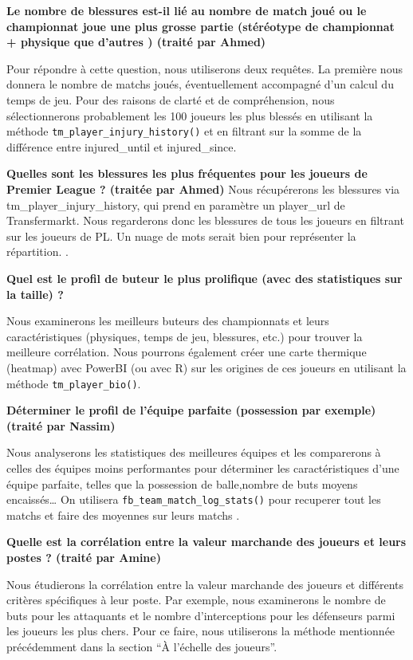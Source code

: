 \documentclass[
]{article}
\begin{document}
\textbf{Le nombre de blessures est-il lié au nombre de match joué ou le
championnat joue une plus grosse partie (stéréotype de championnat +
physique que d'autres ) (traité par Ahmed)}

Pour répondre à cette question, nous utiliserons deux requêtes. La
première nous donnera le nombre de matchs joués, éventuellement
accompagné d'un calcul du temps de jeu. Pour des raisons de clarté et de
compréhension, nous sélectionnerons probablement les 100 joueurs les
plus blessés en utilisant la méthode
\texttt{tm\_player\_injury\_history()} et en filtrant sur la somme de la
différence entre injured\_until et injured\_since.

\textbf{Quelles sont les blessures les plus fréquentes pour les joueurs
de Premier League ? (traitée par Ahmed)} Nous récupérerons les blessures
via tm\_player\_injury\_history, qui prend en paramètre un player\_url
de Transfermarkt. Nous regarderons donc les blessures de tous les
joueurs en filtrant sur les joueurs de PL. Un nuage de mots serait bien
pour représenter la répartition. .

\textbf{Quel est le profil de buteur le plus prolifique (avec des
statistiques sur la taille) ?}

Nous examinerons les meilleurs buteurs des championnats et leurs
caractéristiques (physiques, temps de jeu, blessures, etc.) pour trouver
la meilleure corrélation. Nous pourrons également créer une carte
thermique (heatmap) avec PowerBI (ou avec R) sur les origines de ces
joueurs en utilisant la méthode \texttt{tm\_player\_bio()}.

\textbf{Déterminer le profil de l'équipe parfaite (possession par
exemple) (traité par Nassim)}

Nous analyserons les statistiques des meilleures équipes et les
comparerons à celles des équipes moins performantes pour déterminer les
caractéristiques d'une équipe parfaite, telles que la possession de
balle,nombre de buts moyens encaissés\ldots{} On utilisera
\texttt{fb\_team\_match\_log\_stats()} pour recuperer tout les matchs et
faire des moyennes sur leurs matchs .

\textbf{Quelle est la corrélation entre la valeur marchande des joueurs
et leurs postes ? (traité par Amine)}

Nous étudierons la corrélation entre la valeur marchande des joueurs et
différents critères spécifiques à leur poste. Par exemple, nous
examinerons le nombre de buts pour les attaquants et le nombre
d'interceptions pour les défenseurs parmi les joueurs les plus chers.
Pour ce faire, nous utiliserons la méthode mentionnée précédemment dans
la section ``À l'échelle des joueurs''.
\end{document}
